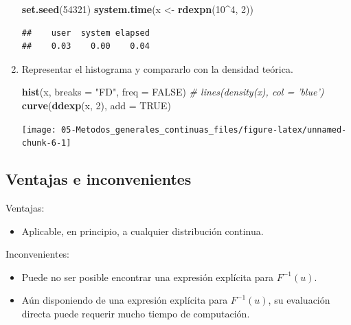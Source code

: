 \documentclass[]{book}
\newenvironment{Shaded}{\begin{snugshade}}{\end{snugshade}}
\newcommand{\KeywordTok}[1]{\textcolor[rgb]{0.13,0.29,0.53}{\textbf{#1}}}
\newcommand{\DataTypeTok}[1]{\textcolor[rgb]{0.13,0.29,0.53}{#1}}
\newcommand{\DecValTok}[1]{\textcolor[rgb]{0.00,0.00,0.81}{#1}}
\newcommand{\StringTok}[1]{\textcolor[rgb]{0.31,0.60,0.02}{#1}}
\newcommand{\CommentTok}[1]{\textcolor[rgb]{0.56,0.35,0.01}{\textit{#1}}}
\newcommand{\OtherTok}[1]{\textcolor[rgb]{0.56,0.35,0.01}{#1}}
\newcommand{\OperatorTok}[1]{\textcolor[rgb]{0.81,0.36,0.00}{\textbf{#1}}}
\newcommand{\NormalTok}[1]{#1}
\providecommand{\tightlist}{%
  \setlength{\itemsep}{0pt}\setlength{\parskip}{0pt}}
\theoremstyle{definition}
\theoremstyle{definition}
\theoremstyle{definition}
\theoremstyle{remark}
\begin{document}
\begin{enumerate}
\begin{Shaded}
\begin{Highlighting}[]
\KeywordTok{set.seed}\NormalTok{(}\DecValTok{54321}\NormalTok{)}
\KeywordTok{system.time}\NormalTok{(x <-}\StringTok{ }\KeywordTok{rdexpn}\NormalTok{(}\DecValTok{10}\OperatorTok{^}\DecValTok{4}\NormalTok{, }\DecValTok{2}\NormalTok{))}
\end{Highlighting}
\end{Shaded}

\begin{verbatim}
##    user  system elapsed 
##    0.03    0.00    0.04
\end{verbatim}
\item
  Representar el histograma y compararlo con la densidad teórica.

\begin{Shaded}
\begin{Highlighting}[]
\KeywordTok{hist}\NormalTok{(x, }\DataTypeTok{breaks =} \StringTok{"FD"}\NormalTok{, }\DataTypeTok{freq =} \OtherTok{FALSE}\NormalTok{)}
\CommentTok{# lines(density(x), col = 'blue')}
\KeywordTok{curve}\NormalTok{(}\KeywordTok{ddexp}\NormalTok{(x, }\DecValTok{2}\NormalTok{), }\DataTypeTok{add =} \OtherTok{TRUE}\NormalTok{)}
\end{Highlighting}
\end{Shaded}

  \begin{center}\texttt{[image: 05-Metodos\_generales\_continuas\_files/figure-latex/unnamed-chunk-6-1]} \end{center}
\end{enumerate}

\subsection{Ventajas e inconvenientes}\label{ventajas-e-inconvenientes}

Ventajas:

\begin{itemize}
\tightlist
\item
  Aplicable, en principio, a cualquier distribución continua.
\end{itemize}

Inconvenientes:

\begin{itemize}
\item
  Puede no ser posible encontrar una expresión explícita para
  \(F^{-1}\left( u\right).\)
\item
  Aún disponiendo de una expresión explícita para
  \(F^{-1}\left( u\right)\), su evaluación directa puede requerir mucho
  tiempo de computación.
\end{itemize}
\end{document}

